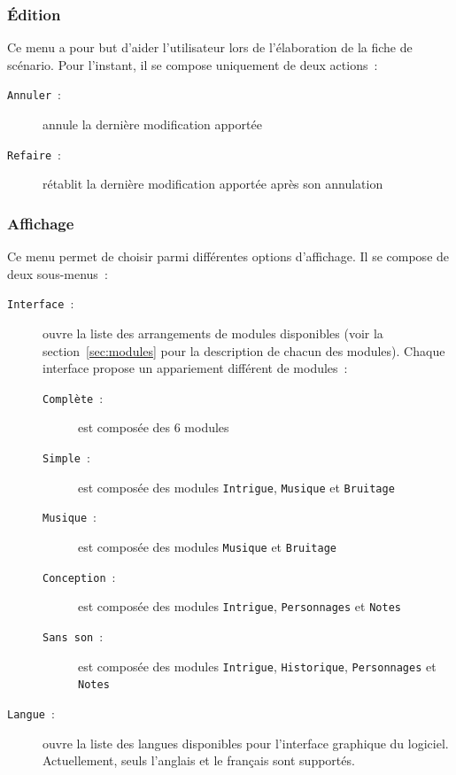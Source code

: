 \documentclass[a4paper,12pt]{article}
\newcommand*{\interfaceitem}[1]{\texttt{#1}}
\begin{document}
\subsubsection{Édition}
\label{sec:edition}

Ce menu a pour but d'aider l'utilisateur lors de l'élaboration de la fiche de scénario.
Pour l'instant, il se compose uniquement de deux actions~:
\begin{description}
    \item[\interfaceitem{Annuler}~:]{annule la dernière modification apportée}
    \item[\interfaceitem{Refaire}~:]{rétablit la dernière modification apportée après son annulation}
\end{description}

\subsubsection{Affichage}
\label{sec:affich}

Ce menu permet de choisir parmi différentes options d'affichage.
Il se compose de deux sous-menus~:
\begin{description}
    \item[\interfaceitem{Interface}~:]{ouvre la liste des arrangements de modules disponibles (voir la section~\ref{sec:modules} pour la description de chacun des modules).
        Chaque interface propose un appariement différent de modules~:
        \begin{description}
            \item[\interfaceitem{Complète}~:]{est composée des 6 modules}
            \item[\interfaceitem{Simple}~:]{est composée des modules \interfaceitem{Intrigue}, \interfaceitem{Musique} et \interfaceitem{Bruitage}}
            \item[\interfaceitem{Musique}~:]{est composée des modules \interfaceitem{Musique} et \interfaceitem{Bruitage}}
            \item[\interfaceitem{Conception}~:]{est composée des modules \interfaceitem{Intrigue}, \interfaceitem{Personnages} et \interfaceitem{Notes}}
            \item[\interfaceitem{Sans son}~:]{est composée des modules \interfaceitem{Intrigue}, \interfaceitem{Historique}, \interfaceitem{Personnages} et \interfaceitem{Notes}}
        \end{description}
    }
    \item[\interfaceitem{Langue}~:]{ouvre la liste des langues disponibles pour l'interface graphique du logiciel.
        Actuellement, seuls l'anglais et le français sont supportés.}
\end{description}
\end{document}
